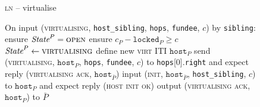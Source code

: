 \begin{figure}[H]
\begin{processbox}{\textsc{ln} -- virtualise}
\begin{algorithmic}[1]
      \State On input (\textsc{virtualising}, \texttt{host\_sibling},
      \texttt{hops}, \texttt{fundee}, $c$) by \texttt{sibling}:
      \Indent
        \State ensure $\textit{State}^P = \textsc{open}$
        \State ensure $c_P - \texttt{locked}_P \geq c$
        \State $\textit{State}^P \gets \textsc{virtualising}$
        \State define new \textsc{virt} ITI $\texttt{host}_P$
        \State send (\textsc{virtualising}, $\texttt{host}_P$, \texttt{hops},
        \texttt{fundee}, $c$) to \texttt{hops}[0].\texttt{right} and expect
        reply (\textsc{virtualising ack}, $\texttt{host}_{\bar{P}}$)
        \State input (\textsc{init}, $\texttt{host}_{\bar{P}}$,
        \texttt{host\_sibling}, $c$) to $\texttt{host}_P$ and expect reply
        (\textsc{host init ok})
        \State output (\textsc{virtualising ack}, $\texttt{host}_P$) to
        $\bar{P}$
      \EndIndent
    \end{algorithmic}
  \end{processbox}
  \caption{}
  \label{code:ln:open}
\end{figure}

